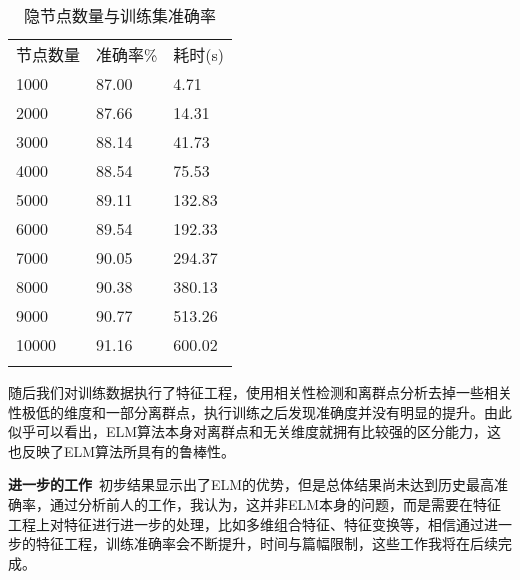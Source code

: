 \documentclass[conference]{IEEEtran}
\begin{document}
\begin{table}[h!t]
	\center
	\caption{隐节点数量与训练集准确率}
	\begin{tabular}{p{80pt}<{\centering}p{60pt}<{\centering}p{60pt}<{\raggedleft}}
		\hline\\[-2.9mm]\hline
		节点数量 & 准确率\% & 耗时(s) \\
		\hline
		1000 & 87.00 & 4.71\\
		2000 & 87.66 & 14.31\\
		3000 & 88.14 & 41.73\\
		4000 & 88.54 & 75.53\\
		5000 & 89.11 & 132.83\\
		6000 & 89.54 & 192.33\\
		7000 & 90.05 & 294.37\\
		8000 & 90.38 & 380.13\\
		9000 & 90.77 & 513.26\\
		10000 & 91.16 & 600.02\\
		\hline\\[-2.9mm]\hline
	\end{tabular}
\end{table}

随后我们对训练数据执行了特征工程，使用相关性检测和离群点分析去掉一些相关性极低的维度和一部分离群点，执行训练之后发现准确度并没有明显的提升。由此似乎可以看出，ELM算法本身对离群点和无关维度就拥有比较强的区分能力，这也反映了ELM算法所具有的鲁棒性。

\textbf{进一步的工作}\ 初步结果显示出了ELM的优势，但是总体结果尚未达到历史最高准确率，通过分析前人的工作，我认为，这并非ELM本身的问题，而是需要在特征工程上对特征进行进一步的处理，比如多维组合特征、特征变换等，相信通过进一步的特征工程，训练准确率会不断提升，时间与篇幅限制，这些工作我将在后续完成。



\end{document}
